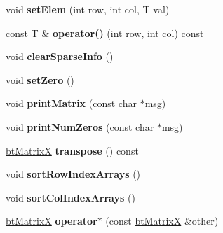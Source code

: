 \begin{DoxyCompactItemize}
\item 
\hypertarget{structbt_matrix_x_ae856c34a8c61142e406f2e953c84eb0d}{void {\bfseries set\+Elem} (int row, int col, T val)}\label{structbt_matrix_x_ae856c34a8c61142e406f2e953c84eb0d}

\item 
\hypertarget{structbt_matrix_x_a943d87912c34c9efda005f6b6e1afa65}{const T \& {\bfseries operator()} (int row, int col) const }\label{structbt_matrix_x_a943d87912c34c9efda005f6b6e1afa65}

\item 
\hypertarget{structbt_matrix_x_a0df163f737bf35a15119b02bebf01818}{void {\bfseries clear\+Sparse\+Info} ()}\label{structbt_matrix_x_a0df163f737bf35a15119b02bebf01818}

\item 
\hypertarget{structbt_matrix_x_a0bdf52f3712fe250237e792f1b0bcb9c}{void {\bfseries set\+Zero} ()}\label{structbt_matrix_x_a0bdf52f3712fe250237e792f1b0bcb9c}

\item 
\hypertarget{structbt_matrix_x_aaef07244038148837ee8cf4ba132c22f}{void {\bfseries print\+Matrix} (const char $\ast$msg)}\label{structbt_matrix_x_aaef07244038148837ee8cf4ba132c22f}

\item 
\hypertarget{structbt_matrix_x_aab5e0fb89759d2902b0e6d5b4eab88a4}{void {\bfseries print\+Num\+Zeros} (const char $\ast$msg)}\label{structbt_matrix_x_aab5e0fb89759d2902b0e6d5b4eab88a4}

\item 
\hypertarget{structbt_matrix_x_a8bf659e22c8f442e7c7b35460d972153}{\hyperlink{structbt_matrix_x}{bt\+Matrix\+X} {\bfseries transpose} () const }\label{structbt_matrix_x_a8bf659e22c8f442e7c7b35460d972153}

\item 
\hypertarget{structbt_matrix_x_a002ff38f37d306cb8f464d4893a05f2b}{void {\bfseries sort\+Row\+Index\+Arrays} ()}\label{structbt_matrix_x_a002ff38f37d306cb8f464d4893a05f2b}

\item 
\hypertarget{structbt_matrix_x_ae95551ad50490b23b106819d6bca1c5c}{void {\bfseries sort\+Col\+Index\+Arrays} ()}\label{structbt_matrix_x_ae95551ad50490b23b106819d6bca1c5c}

\item 
\hypertarget{structbt_matrix_x_a34b8eb6349a9c4376e61844e1e0f9eeb}{\hyperlink{structbt_matrix_x}{bt\+Matrix\+X} {\bfseries operator$\ast$} (const \hyperlink{structbt_matrix_x}{bt\+Matrix\+X} \&other)}\label{structbt_matrix_x_a34b8eb6349a9c4376e61844e1e0f9eeb}


\end{DoxyCompactItemize}
